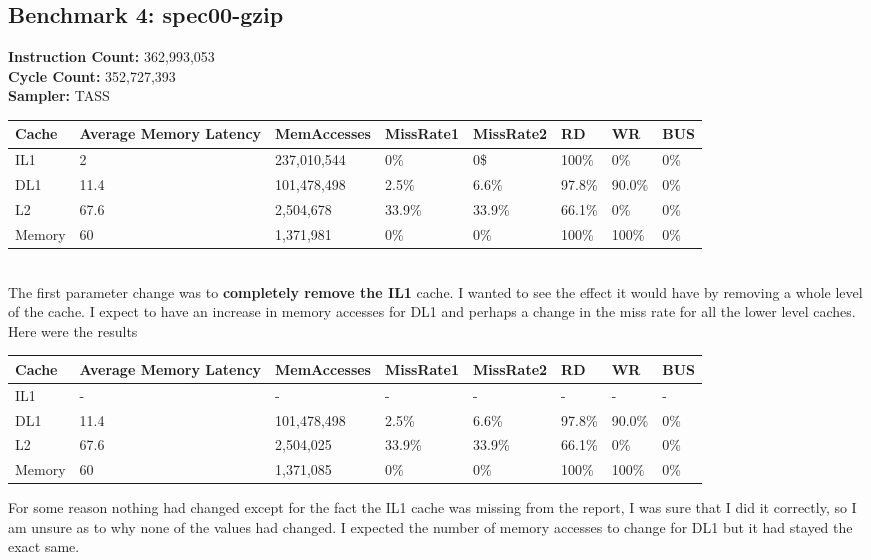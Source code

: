 \documentclass[12pt]{article}
\begin{document}
\newpage
\subsection*{Benchmark 4: spec00-gzip}
\textbf{Instruction Count:} 362,993,053\\
\textbf{Cycle Count:} 352,727,393\\
\textbf{Sampler:} TASS\\
\begin{table}[!h]
\centering
\begin{tabular}{|l|l|l|l|l|l|l|l|}
\hline
\rowcolor[HTML]{C0C0C0} 
Cache & Average Memory Latency & MemAccesses & MissRate1 & MissRate2 & RD & WR & BUS \\ \hline
IL1 & 2 & 237,010,544 & 0\% & 0\$ & 100\% & 0\% & 0\% \\ \hline
DL1 & 11.4 & 101,478,498 & 2.5\% & 6.6\% & 97.8\% & 90.0\% & 0\% \\ \hline
L2 & 67.6 & 2,504,678 & 33.9\% & 33.9\% & 66.1\% & 0\% & 0\% \\ \hline
Memory & 60 & 1,371,981 & 0\% & 0\% & 100\% & 100\% & 0\% \\ \hline
\end{tabular}
\end{table}\\
The first parameter change was to \textbf{completely remove the IL1} cache. I wanted to see the effect it would have by removing a whole level of the cache. I expect to have an increase in memory accesses for DL1 and perhaps a change in the miss rate for all the lower level caches. Here were the results

\begin{table}[!h]
\centering
\begin{tabular}{|l|l|l|l|l|l|l|l|}
\hline
\rowcolor[HTML]{C0C0C0} 
Cache & Average Memory Latency & MemAccesses & MissRate1 & MissRate2 & RD & WR & BUS \\ \hline
IL1 & - & - & - & - & - & - & - \\ \hline
DL1 & 11.4 & 101,478,498 & 2.5\% & 6.6\% & 97.8\% & 90.0\% & 0\% \\ \hline
L2 & 67.6 & 2,504,025 & 33.9\% & 33.9\% & 66.1\% & 0\% & 0\% \\ \hline
Memory & 60 & 1,371,085 & 0\% & 0\% & 100\% & 100\% & 0\% \\ \hline
\end{tabular}
\end{table}
For some reason nothing had changed except for the fact the IL1 cache was missing from the report, I was sure that I did it correctly, so I am unsure as to why none of the values had changed. I expected the number of memory accesses to change for DL1 but it had stayed the exact same.\\
\end{document}
